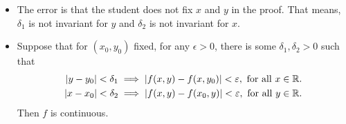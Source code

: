 \begin{problem}
\begin{solution}
\begin{itemize}
    \begin{align*}
        f(x_n, y_n) = \dfrac{1}{2}, \text{ for all } n \in \N.
    \end{align*}
    \item[(b)] The error is that the student does not fix $x$ and $y$ in the proof. That means, $\delta_1$ is not invariant for $y$ and $\delta_2$ is not invariant for $x$.
    \item[(c)] Suppose that for $(x_0, y_0)$ fixed, for any $\epsilon > 0$, there is some $\delta_1, \delta_2 > 0$ such that 
    \begin{align*}
        |y - y_0| < \delta_1 \implies |f(x,y) - f(x,y_0)| < \varepsilon, \text{ for all } x \in \mathbb{R}. \\
        |x - x_0| < \delta_2 \implies |f(x,y) - f(x_0,y)| < \varepsilon, \text{ for all } y \in \mathbb{R}.
    \end{align*}
    Then $f$ is continuous.
\end{itemize}
\end{solution}
\end{problem}

